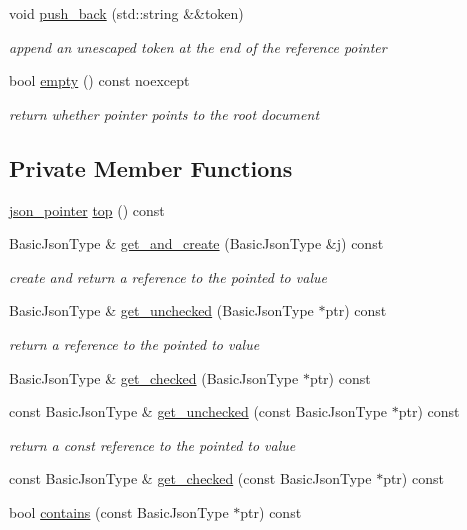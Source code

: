 \begin{DoxyCompactItemize}
void \mbox{\hyperlink{classnlohmann_1_1json__pointer_ac228b13596d3c34185da9fe61b570194}{push\+\_\+back}} (std\+::string \&\&token)
\begin{DoxyCompactList}\small\item\em append an unescaped token at the end of the reference pointer \end{DoxyCompactList}\item 
bool \mbox{\hyperlink{classnlohmann_1_1json__pointer_a649252bda4a2e75a0915b11a25d8bcc3}{empty}} () const noexcept
\begin{DoxyCompactList}\small\item\em return whether pointer points to the root document \end{DoxyCompactList}\end{DoxyCompactItemize}
\subsection*{Private Member Functions}
\begin{DoxyCompactItemize}
\item 
\mbox{\hyperlink{classnlohmann_1_1json__pointer}{json\+\_\+pointer}} \mbox{\hyperlink{classnlohmann_1_1json__pointer_a00eff109d9a0091e42ada9b16b90c8d9}{top}} () const
\item 
Basic\+Json\+Type \& \mbox{\hyperlink{classnlohmann_1_1json__pointer_a583c726016f440ffe65553935c101ff5}{get\+\_\+and\+\_\+create}} (Basic\+Json\+Type \&j) const
\begin{DoxyCompactList}\small\item\em create and return a reference to the pointed to value \end{DoxyCompactList}\item 
Basic\+Json\+Type \& \mbox{\hyperlink{classnlohmann_1_1json__pointer_a577512ee6b7f030e8872b4d29fa5c3e5}{get\+\_\+unchecked}} (Basic\+Json\+Type $\ast$ptr) const
\begin{DoxyCompactList}\small\item\em return a reference to the pointed to value \end{DoxyCompactList}\item 
Basic\+Json\+Type \& \mbox{\hyperlink{classnlohmann_1_1json__pointer_a366d68a67e40d86676d3bdb52e167294}{get\+\_\+checked}} (Basic\+Json\+Type $\ast$ptr) const
\item 
const Basic\+Json\+Type \& \mbox{\hyperlink{classnlohmann_1_1json__pointer_ad6a01f8e1556eef68e5a49b33fef1548}{get\+\_\+unchecked}} (const Basic\+Json\+Type $\ast$ptr) const
\begin{DoxyCompactList}\small\item\em return a const reference to the pointed to value \end{DoxyCompactList}\item 
const Basic\+Json\+Type \& \mbox{\hyperlink{classnlohmann_1_1json__pointer_a55a5bbbc3007e479607304a3e8cb9bf5}{get\+\_\+checked}} (const Basic\+Json\+Type $\ast$ptr) const
\item 
bool \mbox{\hyperlink{classnlohmann_1_1json__pointer_a90d38e45e2d3add52d824bc55da8f772}{contains}} (const Basic\+Json\+Type $\ast$ptr) const
\end{DoxyCompactItemize}
